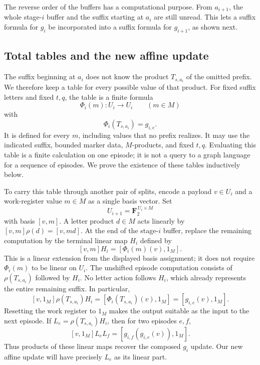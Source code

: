 The reverse order of the buffers has a computational purpose. From
$a_{i+1}$, the whole stage-$i$ buffer and the suffix starting at $a_i$
are still unread. This lets a suffix formula for $g_i$ be incorporated
into a suffix formula for $g_{i+1}$, as shown next.



\subsection{Total tables and the new affine update}

The suffix beginning at $a_i$ does not know the product $T_{s,a_i}$ of
the omitted prefix. We therefore keep a table for every possible value
of that product. For fixed suffix letters and fixed $t,q$, the table is
a finite formula
\[
                 \Phi_i(m):U_i\longrightarrow U_i\qquad(m\in M)
\]
with
\begin{equation}\label{eq:table-property}
                      \Phi_i(T_{s,a_i})=g_{i,e}.
\end{equation}
It is defined for every $m$, including values that no prefix realizes.
It may use the indicated suffix, bounded marker data, $M$-products,
and fixed $t,q$. Evaluating this table is a finite calculation on one
episode; it is not a query to a graph language for a sequence of episodes.
We prove the existence of these tables inductively below.

To carry this table through another pair of splits, encode a payload
$v\in U_i$ and a work-register value $m\in M$ as a single basis vector.
Set
\[
                   U_{i+1}=\mathbf F_2^{\,U_i\times M}
\]
with basis $[v,m]$. A letter product $d\in M$ acts linearly by
$[v,m]\rho(d)=[v,md]$. At the end of the stage-$i$ buffer, replace the
remaining computation by the terminal linear map $H_i$ defined by
\begin{equation}\label{eq:late-map}
                    [v,m]H_i=[\Phi_i(m)(v),1_M].
\end{equation}
This is a linear extension from the displayed basis assignment; it
does not require $\Phi_i(m)$ to be linear on $U_i$. The unshifted
episode computation consists of $\rho(T_{s,a_i})$ followed by $H_i$.
No letter action follows $H_i$, which already represents the entire
remaining suffix. In particular,
\[
 [v,1_M]\rho(T_{s,a_i})H_i
   =[\Phi_i(T_{s,a_i})(v),1_M]
   =[g_{i,e}(v),1_M].
\]
Resetting the work register to $1_M$ makes the output suitable as the
input to the next episode. If $L_e=\rho(T_{s,a_i})H_i$, then for two
episodes $e,f$,
\[
                   [v,1_M]L_eL_f
                      =[g_{i,f}(g_{i,e}(v)),1_M].
\]
Thus products of these linear maps recover the composed $g_i$ update.
Our new affine update will have precisely $L_e$ as its linear part.

